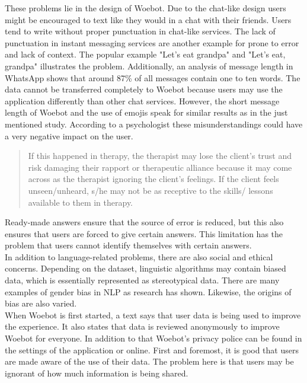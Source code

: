 These problems lie in the design of Woebot.
Due to the chat-like design users might be encouraged to text like they would in a chat with their friends.
Users tend to write without proper punctuation in chat-like services\cite{punctuation}.
The lack of punctuation in instant messaging services are another example for prone to error and lack of context.
The popular example "Let's eat grandpa" and "Let's eat, grandpa" illustrates the problem.
Additionally, an analysis of message length in WhatsApp shows that around 87\% of all messages contain one to ten words\cite{whatsapp-usage}.
The data cannot be transferred completely to Woebot because users may use the application differently than other chat services.
However, the short message length of Woebot and the use of emojis speak for similar results as in the just mentioned study.
According to a psychologist these misunderstandings could have a very negative impact on the user\cite{investigating-students}.

\begin{quote}
    If this happened in therapy, the therapist may lose the client's trust and risk damaging their rapport or therapeutic alliance because it may come across as the therapist ignoring the client's feelings.
    If the client feels unseen/unheard, s/he may not be as receptive to the skills/ lessons available to them in therapy.
\end{quote}

Ready-made answers ensure that the source of error is reduced, but this also ensures that users are forced to give certain answers.
This limitation has the problem that users cannot identify themselves with certain answers\cite{emoticons}.\\

In addition to language-related problems, there are also social and ethical concerns.
Depending on the dataset, linguistic algorithms may contain biased data, which is essentially represented as stereotypical data.
There are many examples of gender bias in NLP as research has shown\cite{gender-bias-nlp}.
Likewise, the origins of bias are also varied\cite{sources-bias-nlp}.\\

When Woebot is first started, a text says that user data is being used to improve the experience.
It also states that data is reviewed anonymously to improve Woebot for everyone.
In addition to that Woebot's privacy police can be found in the settings of the application or online\cite{woebot-privacy}.
First and foremost, it is good that users are made aware of the use of their data.
The problem here is that users may be ignorant of how much information is being shared.\\

